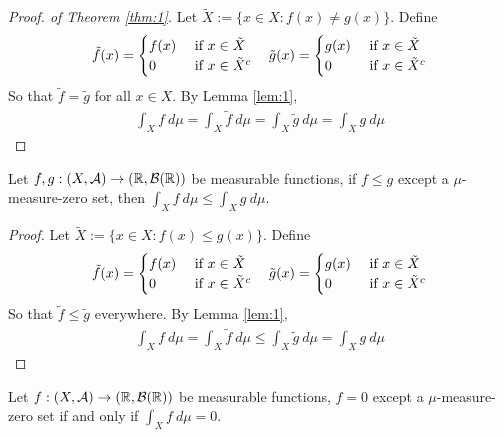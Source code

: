 \documentclass[11pt]{article}
\begin{document}
	\begin{proof}[Proof. of Theorem \ref{thm:1}]
		Let $\tilde{X} := \{x \in X: f(x) \neq g(x)\}$. Define
		\begin{align}
			\tilde{f}(x) = \begin{cases}
				f(x) &\text{{ if }} x \in \tilde{X} \\
				0 &\text{{ if }} x \in \tilde{X}^c
			\end{cases} \quad
			\tilde{g}(x) = \begin{cases}
				g(x) &\text{{ if }} x \in \tilde{X} \\
				0 &\text{{ if }} x \in \tilde{X}^c
			\end{cases}
		\end{align}
		So that $\tilde{f} = \tilde{g}$ for all $x \in X$. By Lemma \ref{lem:1},
		\begin{align}
			\int_X f\ d\mu = \int_X \tilde{f}\ d\mu = \int_X \tilde{g}\ d\mu = \int_X g\ d\mu 
		\end{align}
	\end{proof}

	\begin{theorem}
		Let $f, g: (X, \mathcal{{A}}) \to (\mathbb{R}, \mathcal{{B}}(\mathbb{R}))$ be measurable functions, if $f \leq g$ except a $\mu$-measure-zero set, then $\int_X f\ d\mu \leq \int_X g\ d\mu$.
	\end{theorem}
	
	\begin{proof}
		Let $\tilde{X} := \{x \in X: f(x) \leq g(x)\}$. Define
		\begin{align}
			\tilde{f}(x) = \begin{cases}
				f(x) &\text{{ if }} x \in \tilde{X} \\
				0 &\text{{ if }} x \in \tilde{X}^c
			\end{cases} \quad
			\tilde{g}(x) = \begin{cases}
				g(x) &\text{{ if }} x \in \tilde{X} \\
				0 &\text{{ if }} x \in \tilde{X}^c
			\end{cases}
		\end{align}
		So that $\tilde{f} \leq \tilde{g}$ everywhere. By Lemma \ref{lem:1},
		\begin{align}
			\int_X f\ d\mu = \int_X \tilde{f}\ d\mu \leq \int_X \tilde{g}\ d\mu = \int_X g\ d\mu 
		\end{align}
	\end{proof}

	\begin{theorem}
		Let $f: (X, \mathcal{{A}}) \to (\mathbb{R}, \mathcal{{B}}(\mathbb{R}))$ be measurable functions, $f = 0$ except a $\mu$-measure-zero set if and only if $\int_X f\ d\mu = 0$.
	\end{theorem}
	
\end{document}
